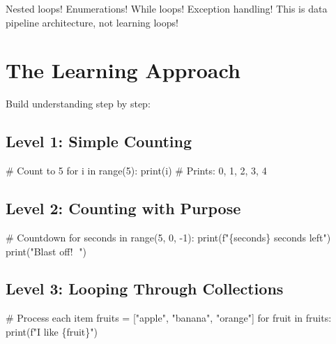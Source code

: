 \documentclass[
  letterpaper,
  DIV=11,
  numbers=noendperiod,
  oneside]{scrreprt}
\newenvironment{Shaded}{}{}
\newcommand{\BuiltInTok}[1]{\textcolor[rgb]{0.84,0.23,0.29}{#1}}
\newcommand{\CommentTok}[1]{\textcolor[rgb]{0.42,0.45,0.49}{#1}}
\newcommand{\ControlFlowTok}[1]{\textcolor[rgb]{0.84,0.23,0.29}{#1}}
\newcommand{\DecValTok}[1]{\textcolor[rgb]{0.00,0.36,0.77}{#1}}
\newcommand{\KeywordTok}[1]{\textcolor[rgb]{0.84,0.23,0.29}{#1}}
\newcommand{\NormalTok}[1]{\textcolor[rgb]{0.14,0.16,0.18}{#1}}
\newcommand{\OperatorTok}[1]{\textcolor[rgb]{0.14,0.16,0.18}{#1}}
\newcommand{\SpecialCharTok}[1]{\textcolor[rgb]{0.00,0.36,0.77}{#1}}
\newcommand{\SpecialStringTok}[1]{\textcolor[rgb]{0.01,0.18,0.38}{#1}}
\newcommand{\StringTok}[1]{\textcolor[rgb]{0.01,0.18,0.38}{#1}}
\begin{document}
Nested loops! Enumerations! While loops! Exception handling! This is
data pipeline architecture, not learning loops!

\section{The Learning Approach}\label{the-learning-approach-4}

Build understanding step by step:

\subsection{Level 1: Simple Counting}\label{level-1-simple-counting}

\begin{Shaded}
\begin{Highlighting}[]
\CommentTok{\# Count to 5}
\ControlFlowTok{for}\NormalTok{ i }\KeywordTok{in} \BuiltInTok{range}\NormalTok{(}\DecValTok{5}\NormalTok{):}
    \BuiltInTok{print}\NormalTok{(i)}
\CommentTok{\# Prints: 0, 1, 2, 3, 4}
\end{Highlighting}
\end{Shaded}

\subsection{Level 2: Counting with
Purpose}\label{level-2-counting-with-purpose}

\begin{Shaded}
\begin{Highlighting}[]
\CommentTok{\# Countdown}
\ControlFlowTok{for}\NormalTok{ seconds }\KeywordTok{in} \BuiltInTok{range}\NormalTok{(}\DecValTok{5}\NormalTok{, }\DecValTok{0}\NormalTok{, }\OperatorTok{{-}}\DecValTok{1}\NormalTok{):}
    \BuiltInTok{print}\NormalTok{(}\SpecialStringTok{f"}\SpecialCharTok{\{}\NormalTok{seconds}\SpecialCharTok{\}}\SpecialStringTok{ seconds left"}\NormalTok{)}
\BuiltInTok{print}\NormalTok{(}\StringTok{"Blast off! 🚀"}\NormalTok{)}
\end{Highlighting}
\end{Shaded}

\subsection{Level 3: Looping Through
Collections}\label{level-3-looping-through-collections}

\begin{Shaded}
\begin{Highlighting}[]
\CommentTok{\# Process each item}
\NormalTok{fruits }\OperatorTok{=}\NormalTok{ [}\StringTok{"apple"}\NormalTok{, }\StringTok{"banana"}\NormalTok{, }\StringTok{"orange"}\NormalTok{]}
\ControlFlowTok{for}\NormalTok{ fruit }\KeywordTok{in}\NormalTok{ fruits:}
    \BuiltInTok{print}\NormalTok{(}\SpecialStringTok{f"I like }\SpecialCharTok{\{}\NormalTok{fruit}\SpecialCharTok{\}}\SpecialStringTok{"}\NormalTok{)}
\end{Highlighting}
\end{Shaded}
\end{document}
